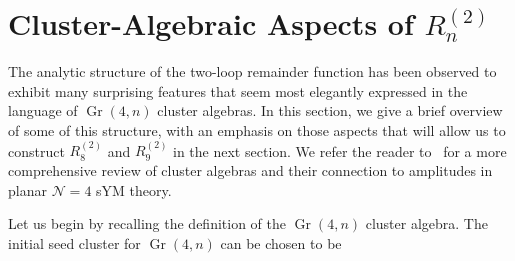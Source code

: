 \documentclass[11pt]{article}
\DeclareMathOperator{\Gr}{Gr}
\def\pdfeq#1{\texorpdfstring{$#1$}{a}}
\begin{document}
\section{Cluster-Algebraic Aspects of \pdfeq{R_n^{(2)}}}
\label{sec:cluster_algebraic_structure}

The analytic structure of the two-loop remainder function has been observed to exhibit many surprising features that seem most elegantly expressed in the language of $\Gr(4,n)$ cluster algebras.  In this section, we give a brief overview of some of this structure, with an emphasis on those aspects that will allow us to construct $R_8^{(2)}$\! and $R_9^{(2)}$\! in the next section. We refer the reader to~\cite{Golden:2018gtk} for a more comprehensive review of cluster algebras and their connection to amplitudes in planar $\mathcal{N} = 4$ sYM theory. 

Let us begin by recalling the definition of the $\Gr(4,n)$ cluster algebra. The initial seed cluster for $\Gr(4,n)$ can be chosen to be~\cite{1088.22009}
\end{document}
